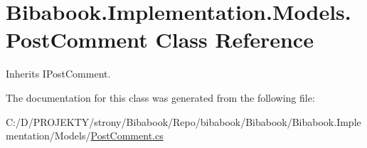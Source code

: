 \hypertarget{class_bibabook_1_1_implementation_1_1_models_1_1_post_comment}{}\section{Bibabook.\+Implementation.\+Models.\+Post\+Comment Class Reference}
\label{class_bibabook_1_1_implementation_1_1_models_1_1_post_comment}


Inherits I\+Post\+Comment.



The documentation for this class was generated from the following file\+:\begin{DoxyCompactItemize}
\item 
C\+:/\+D/\+P\+R\+O\+J\+E\+K\+T\+Y/strony/\+Bibabook/\+Repo/bibabook/\+Bibabook/\+Bibabook.\+Implementation/\+Models/\hyperlink{_post_comment_8cs}{Post\+Comment.\+cs}\end{DoxyCompactItemize}
